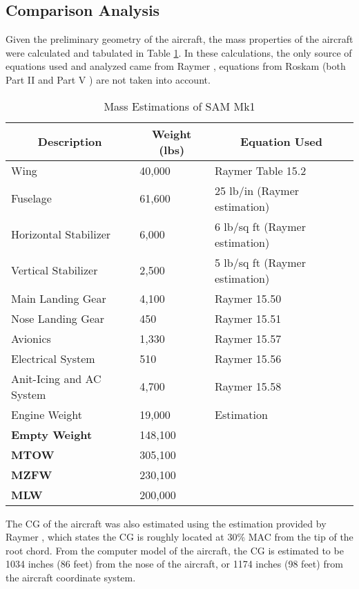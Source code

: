 \subsection{Comparison Analysis}
\label{subsection: comparison}
Given the preliminary geometry of the aircraft, the mass properties of the aircraft were calculated and tabulated in Table \ref{tab:mass_props}. In these calculations, the only source of equations used and analyzed came from Raymer \cite{raymer}, equations from Roskam (both Part II \cite{roskam_2} and Part V \cite{roskam_5}) are not taken into account. 

\begin{table}[!h]
\centering
\caption{Mass Estimations of SAM Mk1}
\begin{tabular}{|p{4cm}||p{2cm}|p{4cm}| }
\toprule
\multicolumn{1}{|c||}{\textbf{Description}} & \multicolumn{1}{c|}{\textbf{Weight (lbs)}} &  
\multicolumn{1}{c|}{\textbf{Equation Used}} \\ \hline \hline 
Wing & 40,000 & Raymer Table 15.2 \\ \hline
Fuselage & 61,600 & 25 lb/in (Raymer estimation) \\ \hline
Horizontal Stabilizer & 6,000 & 6 lb/sq ft (Raymer estimation) \\ \hline
Vertical Stabilizer & 2,500 & 5 lb/sq ft (Raymer estimation) \\ \hline
Main Landing Gear & 4,100 & Raymer 15.50 \\ \hline
Nose Landing Gear & 450 & Raymer 15.51 \\ \hline
Avionics & 1,330 & Raymer 15.57 \\ \hline
Electrical System & 510 & Raymer 15.56 \\ \hline
Anit-Icing and AC System & 4,700 & Raymer 15.58 \\ \hline
Engine Weight & 19,000 & Estimation \\ \hline
\textbf{Empty Weight} & 148,100 &  \\ \hline
\textbf{MTOW} & 305,100 &  \\ \hline
\textbf{MZFW} & 230,100 &  \\ \hline
\textbf{MLW} & 200,000 &  \\
\bottomrule
\end{tabular}
\label{tab:mass_props}
\end{table}
\FloatBarrier

The CG of the aircraft was also estimated using the estimation provided by Raymer \cite{raymer}, which states the CG is roughly located at 30\% MAC from the tip of the root chord. From the computer model of the aircraft, the CG is estimated to be 1034 inches (86 feet) from the nose of the aircraft, or 1174 inches (98 feet) from the aircraft coordinate system.


